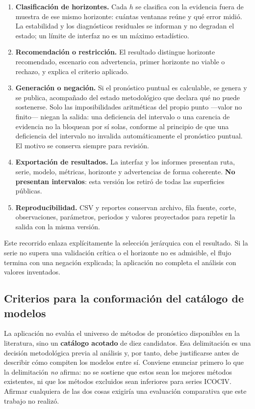 \documentclass[12pt,letterpaper]{article}
\newcommand{\ICOCIV}{ICOCIV}
\begin{document}
\begin{enumerate}[leftmargin=*,label=\textbf{\arabic*.}]
    \item \textbf{Clasificación de horizontes.} Cada \(h\) se clasifica con la evidencia fuera de muestra de ese mismo horizonte: cuántas ventanas reúne y qué error midió. La estabilidad y los diagnósticos residuales se informan y no degradan el estado; un límite de interfaz no es un máximo estadístico.
    \item \textbf{Recomendación o restricción.} El resultado distingue horizonte recomendado, escenario con advertencia, primer horizonte no viable o rechazo, y explica el criterio aplicado.
    \item \textbf{Generación o negación.} Si el pronóstico puntual es calculable, se genera y se publica, acompañado del estado metodológico que declara qué no puede sostenerse. Solo las imposibilidades aritméticas del propio punto ---valor no finito--- niegan la salida: una deficiencia del intervalo o una carencia de evidencia no la bloquean por sí solas, conforme al principio de que una deficiencia del intervalo no invalida automáticamente el pronóstico puntual. El motivo se conserva siempre para revisión.
    \item \textbf{Exportación de resultados.} La interfaz y los informes presentan ruta, serie, modelo, métricas, horizonte y advertencias de forma coherente. \textbf{No presentan intervalos}: esta versión los retiró de todas las superficies públicas.
    \item \textbf{Reproducibilidad.} CSV y reportes conservan archivo, fila fuente, corte, observaciones, parámetros, periodos y valores proyectados para repetir la salida con la misma versión.
\end{enumerate}

Este recorrido enlaza explícitamente la selección jerárquica con el resultado. Si la serie no supera una validación crítica o el horizonte no es admisible, el flujo termina con una negación explicada; la aplicación no completa el análisis con valores inventados.

\subsection{Criterios para la conformación del catálogo de modelos}
\label{sec:criterios_catalogo}

La aplicación no evalúa el universo de métodos de pronóstico disponibles en la literatura, sino un \textbf{catálogo acotado} de diez candidatos. Esa delimitación es una decisión metodológica previa al análisis y, por tanto, debe justificarse antes de describir cómo compiten los modelos entre sí. Conviene enunciar primero lo que la delimitación \emph{no} afirma: no se sostiene que estos sean los mejores métodos existentes, ni que los métodos excluidos sean inferiores para series \ICOCIV{}. Afirmar cualquiera de las dos cosas exigiría una evaluación comparativa que este trabajo no realizó.
\end{document}
